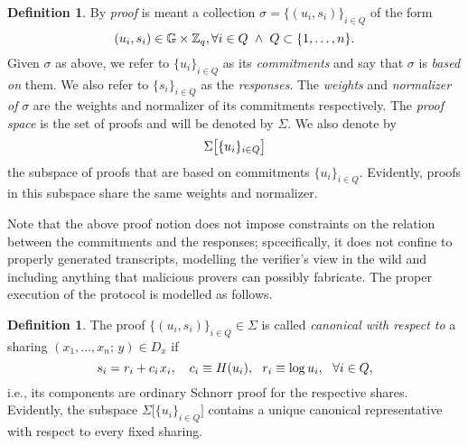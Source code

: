\documentclass[10pt, psamsfonts, reqno]{amsart}
\theoremstyle{definition}
\newtheorem{defn}[thm]{Definition}
\theoremstyle{remark}
\numberwithin{equation}{section}
\begin{document}
\begin{defn}\label{orst_proof_def}
By \textit{proof} is meant a collection
$\sigma = \{(u_i, s_i)\}_{i \in Q}$ of the form
\vspace{5pt}
\begin{equation*}\label{orst_proof_form}
(u_i, s_i) \in \mathbb{G} \times \mathbb{Z}_q,
\vspace{2pt}\forall i \in Q
\hspace{3pt}
\land
\hspace{3pt}
Q \subset \{1, \dots, n\}.
\vspace{5pt}
\end{equation*}
Given $\sigma$ as above, we refer to
$\{u_i\}_{i \in Q}$ as its \textit{commitments} and
say that $\sigma$ is \textit{based on} them.
We also refer to $\{s_i\}_{i \in Q}$ as the
\textit{responses}.
The \textit{weights} and \textit{normalizer of} $\sigma$
are the weights and normalizer of its commitments respectively.
The \textit{proof space}
is the set of proofs and will be denoted by $\Sigma$.
We also denote by
\vspace{5pt}
\begin{equation*}\label{orst_proofs_on_commitments}
\Sigma\big[\{u_i\}_{i \in Q}\big]
\vspace{5pt}
\end{equation*}
the subspace of proofs that are
based on commitments $\{u_i\}_{i \in Q}$.
Evidently, proofs in this subspace
share the same weights and normalizer.
\end{defn}

\noindent
Note that the above proof notion does not impose
constraints on the relation between
the commitments and the responses;
spcecifically, it does not confine
to properly generated transcripts,
modelling the verifier's view in the wild
and including anything that malicious provers can possibly fabricate.
The proper execution of the protocol
is modelled as follows.

\begin{defn}\label{orst_canonical_def}
The proof $\{(u_i, s_i)\}_{i \in Q} \in \Sigma$ is called
\textit{canonical with respect to} a sharing
$(x_1, \dots, x_n;\hspace{2pt} y) \in D_x$ if
\vspace{5pt}
\begin{equation}\label{orst_canonical}
s_i = r_i + c_i \hspace{1pt} x_i,
\ \ \ c_i \equiv H(u_i),
\ \ r_i \equiv \log u_i,
\ \ \forall i \in Q,
\vspace{5pt}
\end{equation}
i.e., its components are ordinary Schnorr proof
for the respective shares.
Evidently, the subspace
$\Sigma\big[\{u_i\}_{i \in Q}\big]$
contains a unique canonical representative
with respect to every fixed sharing.
\end{defn}
\end{document}
